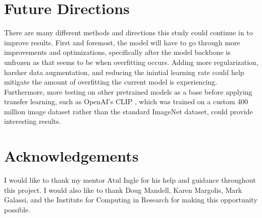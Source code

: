 \documentclass{article}
\begin{document}
\section{Future Directions}
There are many different methods and directions this study could continue in to improve results. First and foremost, the model will have to go through more improvements and optimizations, specifically after the model backbone is unfrozen as that seems to be when overfitting occurs. Adding more regularization, harsher data augmentation, and reducing the inintial learning rate could help mitigate the amount of overfitting the current model is experiencing. Furthermore, more testing on other pretrained models as a base before applying transfer learning, such as OpenAI's CLIP \cite{DBLP:journals/corr/abs-2103-00020}, which was trained on a custom 400 million image dataset rather than the standard ImageNet dataset, could provide interesting results.

\section*{Acknowledgements}
I would like to thank my mentor Atul Ingle for his help and guidance throughout this project. I would also like to thank Doug Mandell, Karen Margolis, Mark Galassi, and the Institute for Computing in Research for making this opportunity possible.



\end{document}
